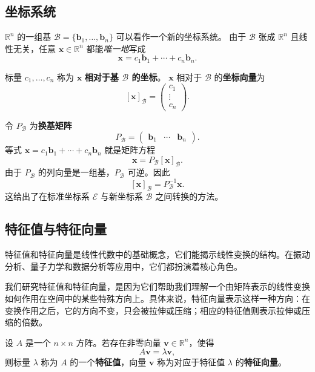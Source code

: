 \subsection{坐标系统}
$\mathbb{R}^n$ 的一组基 $\mathcal{B}=\{\mathbf{b}_1,\ldots,\mathbf{b}_n\}$ 可以看作一个新的坐标系统。
由于 $\mathcal{B}$ 张成 $\mathbb{R}^n$ 且线性无关，任意 $\mathbf{x}\in\mathbb{R}^n$ 都能\emph{唯一地}写成
\[ \mathbf{x}=c_1\mathbf{b}_1+\cdots+c_n\mathbf{b}_n. \]
\begin{definition}
标量 $c_1,\ldots,c_n$ 称为 $\mathbf{x}$ \textbf{相对于基 $\mathcal{B}$ 的坐标}。
$\mathbf{x}$ 相对于 $\mathcal{B}$ 的\textbf{坐标向量}为
\[ [\mathbf{x}]_{\mathcal{B}}=\begin{pmatrix}c_1\\\vdots\\c_n\end{pmatrix}. \]
\end{definition}

令 $P_{\mathcal{B}}$ 为\textbf{换基矩阵}
\[
P_{\mathcal{B}}=\begin{pmatrix}\mathbf{b}_1&\cdots&\mathbf{b}_n\end{pmatrix}.
\]
等式 $\mathbf{x}=c_1\mathbf{b}_1+\cdots+c_n\mathbf{b}_n$ 就是矩阵方程
\[ \mathbf{x}=P_{\mathcal{B}}[\mathbf{x}]_{\mathcal{B}}. \]
由于 $P_{\mathcal{B}}$ 的列向量是一组基，$P_{\mathcal{B}}$ 可逆。因此
\[ [\mathbf{x}]_{\mathcal{B}}=P_{\mathcal{B}}^{-1}\mathbf{x}. \]
这给出了在标准坐标系 $\mathcal{E}$ 与新坐标系 $\mathcal{B}$ 之间转换的方法。

\subsection{特征值与特征向量}

特征值和特征向量是线性代数中的基础概念，它们能揭示线性变换的结构。在振动分析、量子力学和数据分析等应用中，它们都扮演着核心角色。

我们研究特征值和特征向量，是因为它们帮助我们理解一个由矩阵表示的线性变换如何作用在空间中的某些特殊方向上。具体来说，特征向量表示这样一种方向：在变换作用之后，它的方向不变，只会被拉伸或压缩；相应的特征值则表示拉伸或压缩的倍数。

\begin{definition}[特征值与特征向量]
设 $A$ 是一个 $n\times n$ 方阵。若存在非零向量 $\mathbf{v}\in\mathbb{R}^n$，使得
\[
A\mathbf{v}=\lambda\mathbf{v},
\]
则标量 $\lambda$ 称为 $A$ 的一个\textbf{特征值}，向量 $\mathbf{v}$ 称为对应于特征值 $\lambda$ 的\textbf{特征向量}。
\end{definition}

